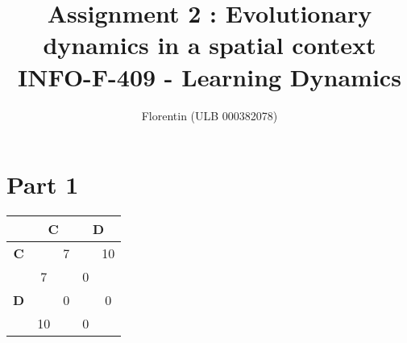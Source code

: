 \documentclass[a4paper]{article}
\title{
    Assignment 2 : Evolutionary dynamics in a spatial context\\
    \small INFO-F-409 - Learning Dynamics
}
\author{Florentin \bsc{Hennecker} (ULB 000382078)}
\date{}
\begin{document}
\maketitle

\section{Part 1}
\begin{tabular}{c|cc|cc}
	& \multicolumn{2}{c|}{\textbf{C}} & \multicolumn{2}{c}{\textbf{D}}\\
	\hline
	\textbf{C} && 7 && 10\\
	& 7 && 0 &\\
	\hline
	\textbf{D} && 0 && 0\\
	& 10 && 0 &\\
\end{tabular}
\end{document}
